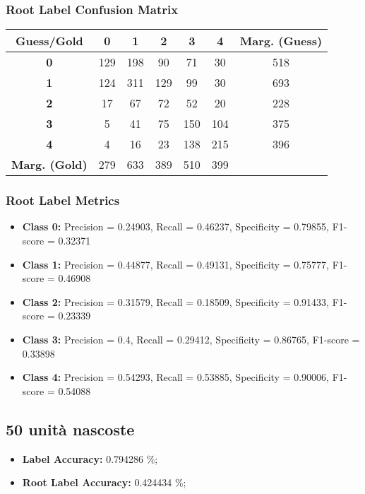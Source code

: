 \subsubsection{Root Label Confusion Matrix}
\begin{table}[h]
\centering
\begin{tabular}{c|ccccc|c}
\textbf{Guess/Gold} & \textbf{0} & \textbf{1} & \textbf{2} & \textbf{3} & \textbf{4} & \textbf{Marg. (Guess)} \\
\hline
\textbf{0} & 129 & 198 & 90 & 71 & 30 & 518 \\
\textbf{1} & 124 & 311 & 129 & 99 & 30 & 693 \\
\textbf{2} & 17 & 67 & 72 & 52 & 20 & 228 \\
\textbf{3} & 5 & 41 & 75 & 150 & 104 & 375 \\
\textbf{4} & 4 & 16 & 23 & 138 & 215 & 396 \\
\hline
\textbf{Marg. (Gold)} & 279 & 633 & 389 & 510 & 399 & \\
\end{tabular}
\end{table}

\subsubsection{Root Label Metrics}
\begin{itemize}
    \item \textbf{Class 0:} Precision = 0.24903, Recall = 0.46237, Specificity = 0.79855, F1-score = 0.32371
    \item \textbf{Class 1:} Precision = 0.44877, Recall = 0.49131, Specificity = 0.75777, F1-score = 0.46908
    \item \textbf{Class 2:} Precision = 0.31579, Recall = 0.18509, Specificity = 0.91433, F1-score = 0.23339
    \item \textbf{Class 3:} Precision = 0.4, Recall = 0.29412, Specificity = 0.86765, F1-score = 0.33898
    \item \textbf{Class 4:} Precision = 0.54293, Recall = 0.53885, Specificity = 0.90006, F1-score = 0.54088
\end{itemize}

\subsection{50 unità nascoste}

\begin{itemize}
    \item \textbf{Label Accuracy:} 0.794286 \%;
    \item \textbf{Root Label Accuracy:} 0.424434 \%;
\end{itemize}

